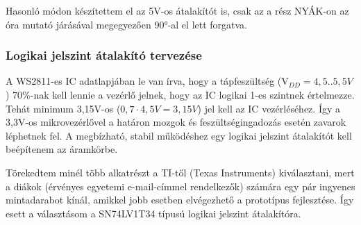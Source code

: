 \documentclass[../main.tex]{subfiles}
\begin{document}
            Hasonló módon készítettem el az 5V-os átalakítót is, csak az a rész NYÁK-on az óra mutató járásával megegyezően 90°-al el lett forgatva.
            
        \subsubsection{Logikai jelszint átalakító tervezése}
            A WS2811-es IC adatlapjában \cite{ds_ws2811} le van írva, hogy a tápfeszültség (V$_{DD} = 4,5..5,5V$) 70\%-nak kell lennie a vezérlő jelnek, hogy az IC logikai 1-es szintnek értelmezze. Tehát minimum 3,15V-os ($0,7\cdot4,5V=3,15V$) jel kell az IC vezérléséhez. Így a 3,3V-os mikrovezérlővel a határon mozgok és feszültségingadozás esetén zavarok léphetnek fel. A megbízható, stabil működéshez egy logikai jelszint átalakítót kell beépítenem az áramkörbe. 

            Törekedtem minél több alkatrészt a TI-től (Texas Instruments) kiválasztani, mert a diákok (érvényes egyetemi e-mail-címmel rendelkezők) számára egy pár ingyenes mintadarabot kínál, amikkel jobb esetben elvégezhető a prototípus fejlesztése. Így esett a választásom a SN74LV1T34 típusú logikai jelszint átalakítóra.
            
            \begin{figure}[h!]
                \begin{floatrow}
                \end{floatrow}
            \end{figure}
            
\end{document}
